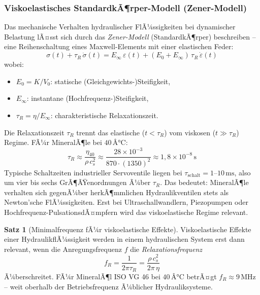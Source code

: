 ﻿\documentclass[a4paper,12pt]{scrreprt}
\theoremstyle{definition}
\newtheorem{satz}{Satz}[section]
\begin{document}
\subsubsection{Viskoelastisches StandardkÃ¶rper-Modell (Zener-Modell)}

Das mechanische Verhalten hydraulischer FlÃ¼ssigkeiten bei dynamischer Belastung
lÃ¤sst sich durch das \emph{Zener-Modell} (StandardkÃ¶rper) beschreiben --
eine Reihenschaltung eines Maxwell-Elements mit einer elastischen Feder:
\begin{equation}
  \sigma(t) + \tau_R \, \dot{\sigma}(t)
    = E_\infty \, \varepsilon(t) + (E_0 + E_\infty) \, \tau_R \, \dot{\varepsilon}(t)
  \label{eq:zener_modell}
\end{equation}
wobei:
\begin{itemize}
  \item $E_0 = K / V_0$: statische (Gleichgewichts-)Steifigkeit,
  \item $E_\infty$: instantane (Hochfrequenz-)Steifigkeit,
  \item $\tau_R = \eta / E_\infty$: charakteristische Relaxationszeit.
\end{itemize}

Die Relaxationszeit $\tau_R$ trennt das elastische ($t < \tau_R$) vom
viskosen ($t \gg \tau_R$) Regime. FÃ¼r MineralÃ¶le bei $40\,Â°\mathrm{C}$:
\begin{equation}
  \tau_R \approx \frac{\eta_{40}}{\rho \, c_s^2}
    \approx \frac{28 \times 10^{-3}}{870 \cdot (1350)^2}
    \approx 1{,}8 \times 10^{-8}\,\mathrm{s}
  \label{eq:tau_mineraloel}
\end{equation}
Typische Schaltzeiten industrieller Servoventile liegen bei
$\tau_{\mathrm{schalt}} = 1$--$10\,\mathrm{ms}$, also um vier bis sechs
GrÃ¶ÃŸenordnungen Ã¼ber $\tau_R$. Das bedeutet: MineralÃ¶le verhalten sich
gegenÃ¼ber herkÃ¶mmlichen Hydraulikventilen stets als Newton'sche FlÃ¼ssigkeiten.
Erst bei Ultraschallwandlern, Piezopumpen oder Hochfrequenz-PulsationsdÃ¤mpfern
wird das viskoelastische Regime relevant.

\begin{satz}[Minimalfrequenz fÃ¼r viskoelastische Effekte]
  Viskoelastische Effekte einer HydraulikflÃ¼ssigkeit werden in einem
  hydraulischen System erst dann relevant, wenn die Anregungsfrequenz
  $f$ die \emph{Relaxationsfrequenz}
  \begin{equation}
    f_R = \frac{1}{2\pi \tau_R} = \frac{\rho \, c_s^2}{2\pi \, \eta}
    \label{eq:relaxationsfrequenz}
  \end{equation}
  Ã¼berschreitet. FÃ¼r MineralÃ¶l ISO VG 46 bei $40\,Â°\mathrm{C}$ betrÃ¤gt
  $f_R \approx 9\,\mathrm{MHz}$ -- weit oberhalb der Betriebsfrequenz
  Ã¼blicher Hydrauliksysteme.
\end{satz}
\end{document}
